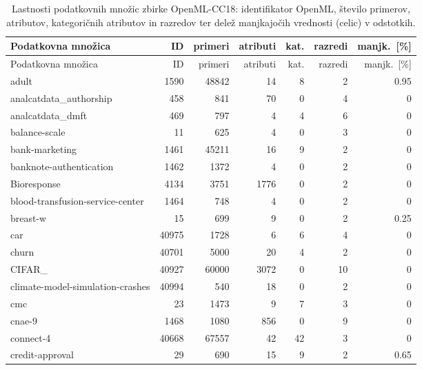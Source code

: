 {\scriptsize
\setlength{\tabcolsep}{4pt}
\begin{longtable}{>{\raggedright\arraybackslash}p{4.6cm}rrrrrr}
\caption{Lastnosti podatkovnih množic zbirke OpenML-CC18: identifikator OpenML, število primerov, atributov, kategoričnih atributov in razredov ter delež manjkajočih vrednosti (celic) v odstotkih.}
\label{tab:cc18-lastnosti} \\
\hline
Podatkovna množica & ID & primeri & atributi & kat. & razredi & manjk.\ [\%] \\
\hline
\endfirsthead
\hline
Podatkovna množica & ID & primeri & atributi & kat. & razredi & manjk.\ [\%] \\
\hline
\endhead
\hline
\endfoot
adult & 1590 & \num{48842} & \num{14} & 8 & 2 & \num{0.95} \\
analcatdata\_\allowbreak authorship & 458 & \num{841} & \num{70} & 0 & 4 & 0 \\
analcatdata\_\allowbreak dmft & 469 & \num{797} & \num{4} & 4 & 6 & 0 \\
balance-scale & 11 & \num{625} & \num{4} & 0 & 3 & 0 \\
bank-marketing & 1461 & \num{45211} & \num{16} & 9 & 2 & 0 \\
banknote-authentication & 1462 & \num{1372} & \num{4} & 0 & 2 & 0 \\
Bioresponse & 4134 & \num{3751} & \num{1776} & 0 & 2 & 0 \\
blood-transfusion-service-center & 1464 & \num{748} & \num{4} & 0 & 2 & 0 \\
breast-w & 15 & \num{699} & \num{9} & 0 & 2 & \num{0.25} \\
car & 40975 & \num{1728} & \num{6} & 6 & 4 & 0 \\
churn & 40701 & \num{5000} & \num{20} & 4 & 2 & 0 \\
CIFAR\_\allowbreak 10 & 40927 & \num{60000} & \num{3072} & 0 & 10 & 0 \\
climate-model-simulation-crashes & 40994 & \num{540} & \num{18} & 0 & 2 & 0 \\
cmc & 23 & \num{1473} & \num{9} & 7 & 3 & 0 \\
cnae-9 & 1468 & \num{1080} & \num{856} & 0 & 9 & 0 \\
connect-4 & 40668 & \num{67557} & \num{42} & 42 & 3 & 0 \\
credit-approval & 29 & \num{690} & \num{15} & 9 & 2 & \num{0.65} \\

\end{longtable}}
